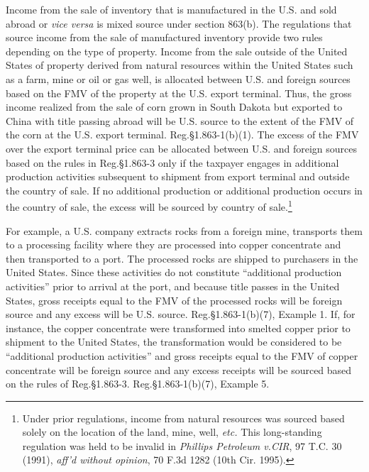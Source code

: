 Income from the sale of inventory that is manufactured in the U.S. and sold abroad or \emph{vice versa} is mixed source under section 863(b).   The regulations that source income from the sale of manufactured inventory provide two rules depending on the type of property.  Income from the sale outside of the United States of property derived from natural resources within the United States such as a farm, mine or oil or gas well, is allocated between U.S. and foreign sources based on the FMV of the property at the U.S. export terminal.  Thus, the gross income realized from the sale of corn grown in South Dakota but exported to China with title passing abroad will be U.S. source to the extent of the FMV of the corn at the U.S. export terminal.  Reg.\@ \S1.863-1(b)(1).  The excess of the FMV over the export terminal price can be allocated between U.S. and foreign sources based on the rules in Reg.\@ \S 1.863-3 only if the taxpayer engages in additional production activities subsequent to shipment from export terminal and outside the country of sale.  If no additional production or additional production occurs in the country of sale, the excess will be sourced by country of sale.\footnote{Under prior regulations, income from natural resources was sourced based solely on the location of the land, mine, well, \emph{etc.} This long-standing regulation was held to be invalid in \emph{Phillips Petroleum v.\@ CIR}, 97 T.C. 30 (1991), \emph{aff'd without opinion}, 70 F.3d 1282 (10th Cir. 1995).}

For example, a U.S. company extracts rocks from a foreign mine, transports them to a processing facility where they are processed into copper concentrate and then transported to a port.  The processed rocks are shipped to purchasers in the United States.  Since these activities do not constitute ``additional production activities'' prior to arrival at the port, and because title passes in the United States, gross receipts equal to the FMV of the processed rocks will be foreign source and any excess will be U.S. source.  Reg.\@ \S 1.863-1(b)(7), Example 1.  If, for instance, the copper concentrate were transformed into smelted copper prior to shipment to the United States, the transformation would be considered to be ``additional production activities'' and gross receipts equal to the FMV of copper concentrate will be foreign source and any excess receipts will be sourced based on the rules of Reg.\@ \S1.863-3. Reg.\@ \S 1.863-1(b)(7), Example 5.  

